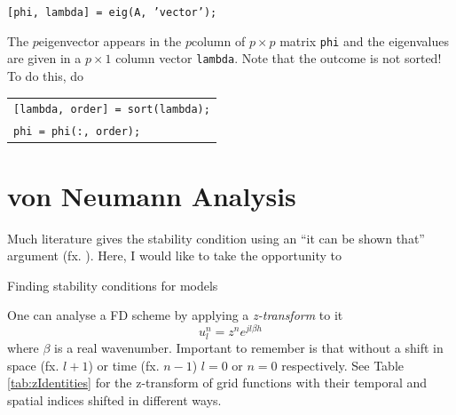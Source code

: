 \begin{center}
    \texttt{[phi, lambda] = eig(A, {\color[HTML]{A100F4}'vector'});}
\end{center}
The $p$\th eigenvector appears in the $p$\th column of $p\times p$ matrix \texttt{phi} and the eigenvalues are given in a $p \times 1$ column vector \texttt{lambda}. Note that the outcome is not sorted! To do this, do 
%
\begin{center}
    \begin{tabular}{l}
    \texttt{[lambda, order] = sort(lambda);}\\
    \texttt{phi = phi(:, order);}
    \end{tabular}
\end{center}

\section{von Neumann Analysis}\label{sec:stabilityAnalysis}
Much literature gives the stability condition using an ``it can be shown that'' argument (fx. \cite{Bilbao2009}). Here, I would like to take the opportunity to 

Finding stability conditions for models

One can analyse a FD scheme by applying a \textit{z-transform} to it
\begin{equation}
    u_l^n = z^n e^{jl\beta h}
\end{equation}
where $\beta$ is a real wavenumber. Important to remember is that without a shift in space (fx. $l+1$) or time (fx. $n-1$) $l = 0$ or $n=0$ respectively. See Table \ref{tab:zIdentities} for the z-transform of grid functions with their temporal and spatial indices shifted in different ways.

